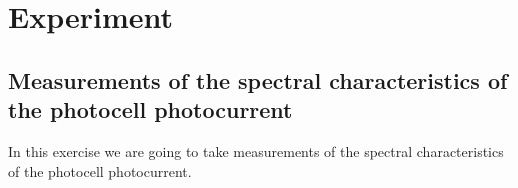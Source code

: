 \section{Experiment}

\subsection{Measurements of the spectral characteristics of the photocell photocurrent}

In this exercise we are going to take measurements of the spectral characteristics of the
photocell photocurrent.



\begin{table}[H]
    \centering
    \begin{tabular}{l|l|l|l|l|l|l|l|l}
    

\end{tabular}
\end{table}
